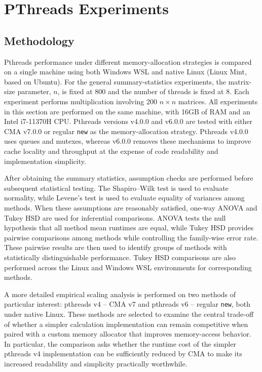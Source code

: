 \section{PThreads Experiments}
\label{sec:pthreads-experiments}

\subsection{Methodology}

Pthreads performance under different memory-allocation strategies is compared on a single machine using both Windows WSL and native Linux (Linux Mint, based on Ubuntu). For the general summary-statistics experiments, the matrix-size parameter, $n$, is fixed at 800 and the number of threads is fixed at 8. Each experiment performs multiplication involving 200 $n \times n$ matrices. All experiments in this section are performed on the same machine, with 16GB of RAM and an Intel i7-11370H CPU. Pthreads versions v4.0.0 and v6.0.0 are tested with either CMA v7.0.0 or regular \texttt{new} as the memory-allocation strategy. Pthreads v4.0.0 uses queues and mutexes, whereas v6.0.0 removes these mechanisms to improve cache locality and throughput at the expense of code readability and implementation simplicity.

After obtaining the summary statistics, assumption checks are performed before subsequent statistical testing. The Shapiro--Wilk test is used to evaluate normality, while Levene's test is used to evaluate equality of variances among methods. When these assumptions are reasonably satisfied, one-way ANOVA and Tukey HSD are used for inferential comparisons. ANOVA tests the null hypothesis that all method mean runtimes are equal, while Tukey HSD provides pairwise comparisons among methods while controlling the family-wise error rate. These pairwise results are then used to identify groups of methods with statistically distinguishable performance. Tukey HSD comparisons are also performed across the Linux and Windows WSL environments for corresponding methods.

A more detailed empirical scaling analysis is performed on two methods of particular interest: pthreads v4 -- CMA v7 and pthreads v6 -- regular \texttt{new}, both under native Linux. These methods are selected to examine the central trade-off of whether a simpler calculation implementation can remain competitive when paired with a custom memory allocator that improves memory-access behavior. In particular, the comparison asks whether the runtime cost of the simpler pthreads v4 implementation can be sufficiently reduced by CMA to make its increased readability and simplicity practically worthwhile.

